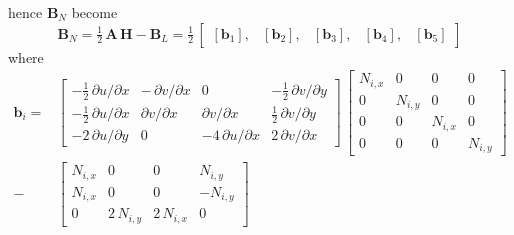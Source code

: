 hence $\mathbf{B}_N$ become
\begin{equation}
\mathbf{B}_N = \tfrac{1}{2} \, \mathbf{A} \, \mathbf{H} - \mathbf{B}_L = \tfrac{1}{2} \, \begin{bmatrix}
 [\mathbf{b}_1], & [\mathbf{b}_2], & [\mathbf{b}_3], & [\mathbf{b}_4], & [\mathbf{b}_5] 
\end{bmatrix} 
\end{equation}
where
\begin{equation}
\begin{aligned}
\mathbf{b}_i  = &   \begin{bmatrix}
-\frac{1}{2} \, \partial u / \partial x &  - \, \partial v / \partial x & 0 & -\frac{1}{2} \, \partial v / \partial y \\
-\frac{1}{2} \, \partial u / \partial x &  \partial v / \partial x & \partial v / \partial x & \frac{1}{2} \, \partial v / \partial y \\
-2 \, \partial u / \partial y & 0 & -4 \, \partial u / \partial x  & 2 \, \partial v / \partial x \end{bmatrix}  \, \begin{bmatrix}
N_{i,x} &  0 & 0 & 0 \\
0 & N_{i,y} & 0 & 0  \\
0 & 0 & N_{i,x} & 0 \\
0 & 0 & 0  & N_{i,y} \end{bmatrix} \\
 - & \begin{bmatrix}
 N_{i,x} & 0 & 0 &   N_{i,y} \\
 N_{i,x} & 0 & 0 & - N_{i,y} \\
 0 & 2 \,  N_{i,y} & 2 \,  N_{i,x} & 0 \end{bmatrix}
\end{aligned}
\end{equation}

